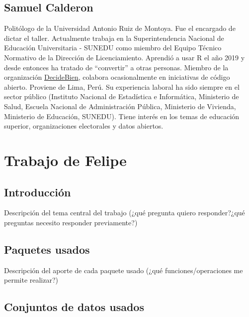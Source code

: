 \documentclass[
]{book}
\begin{document}
\hypertarget{samuel-calderon}{%
\section*{Samuel Calderon}\label{samuel-calderon}}

Politólogo de la Universidad Antonio Ruiz de Montoya. Fue el encargado de dictar el taller. Actualmente trabaja en la Superintendencia Nacional de Educación Universitaria - SUNEDU como miembro del Equipo Técnico Normativo de la Dirección de Licenciamiento. Aprendió a usar R el año 2019 y desde entonces ha tratado de ``convertir'' a otras personas. Miembro de la organización \href{https://github.com/DecideBienpe}{DecideBien}, colabora ocasionalmente en iniciativas de código abierto. Proviene de Lima, Perú. Su experiencia laboral ha sido siempre en el sector público (Instituto Nacional de Estadística e Informática, Ministerio de Salud, Escuela Nacional de Administración Pública, Ministerio de Vivienda, Ministerio de Educación, SUNEDU). Tiene interés en los temas de educación superior, organizaciones electorales y datos abiertos.

\hypertarget{trabajo-de-felipe}{%
\chapter{Trabajo de Felipe}\label{trabajo-de-felipe}}

\hypertarget{introducciuxf3n}{%
\section{Introducción}\label{introducciuxf3n}}

Descripción del tema central del trabajo (¿qué pregunta quiero responder?¿qué preguntas necesito responder previamente?)

\hypertarget{paquetes-usados}{%
\section{Paquetes usados}\label{paquetes-usados}}

Descripción del aporte de cada paquete usado (¿qué funciones/operaciones me permite realizar?)

\hypertarget{conjuntos-de-datos-usados}{%
\section{Conjuntos de datos usados}\label{conjuntos-de-datos-usados}}
\end{document}
